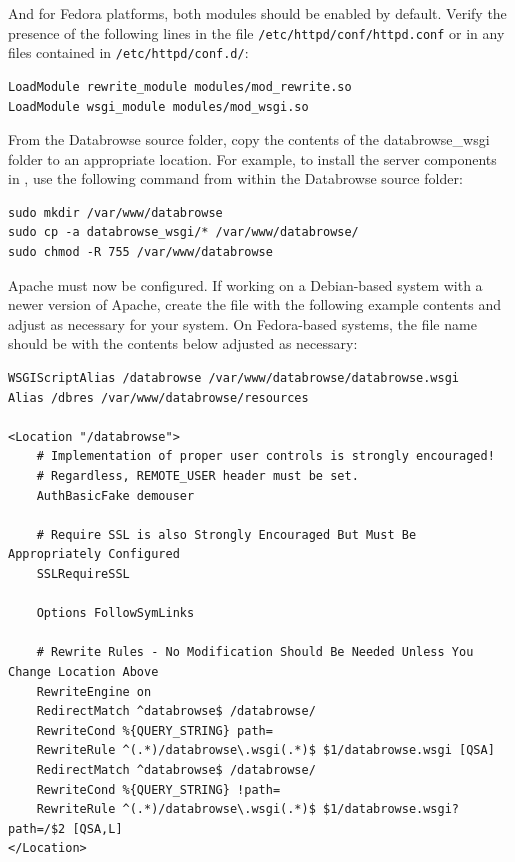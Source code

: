 \documentclass[10pt]{article}
\begin{document}
And for Fedora platforms, both modules should be enabled by default.  Verify the presence of the following lines in the file \texttt{/etc/httpd/conf/httpd.conf} or in any files contained in \texttt{/etc/httpd/conf.d/}:

\begin{verbatim}
LoadModule rewrite_module modules/mod_rewrite.so
LoadModule wsgi_module modules/mod_wsgi.so
\end{verbatim}

From the Databrowse source folder, copy the contents of the databrowse\_wsgi folder to an appropriate location.  For example, to install the server components in , use the following command from within the Databrowse source folder:

\begin{verbatim}
sudo mkdir /var/www/databrowse
sudo cp -a databrowse_wsgi/* /var/www/databrowse/
sudo chmod -R 755 /var/www/databrowse
\end{verbatim}

Apache must now be configured.  If working on a Debian-based system with a newer version of Apache, create the file  with the following example contents and adjust as necessary for your system.  On Fedora-based systems, the file name should be  with the contents below adjusted as necessary:

\begin{verbatim}
WSGIScriptAlias /databrowse /var/www/databrowse/databrowse.wsgi
Alias /dbres /var/www/databrowse/resources

<Location "/databrowse">
    # Implementation of proper user controls is strongly encouraged!
    # Regardless, REMOTE_USER header must be set.
    AuthBasicFake demouser

    # Require SSL is also Strongly Encouraged But Must Be Appropriately Configured
    SSLRequireSSL

    Options FollowSymLinks

    # Rewrite Rules - No Modification Should Be Needed Unless You Change Location Above
    RewriteEngine on
    RedirectMatch ^databrowse$ /databrowse/
    RewriteCond %{QUERY_STRING} path=
    RewriteRule ^(.*)/databrowse\.wsgi(.*)$ $1/databrowse.wsgi [QSA]
    RedirectMatch ^databrowse$ /databrowse/
    RewriteCond %{QUERY_STRING} !path=
    RewriteRule ^(.*)/databrowse\.wsgi(.*)$ $1/databrowse.wsgi?path=/$2 [QSA,L]
</Location>
\end{verbatim}
\end{document}
